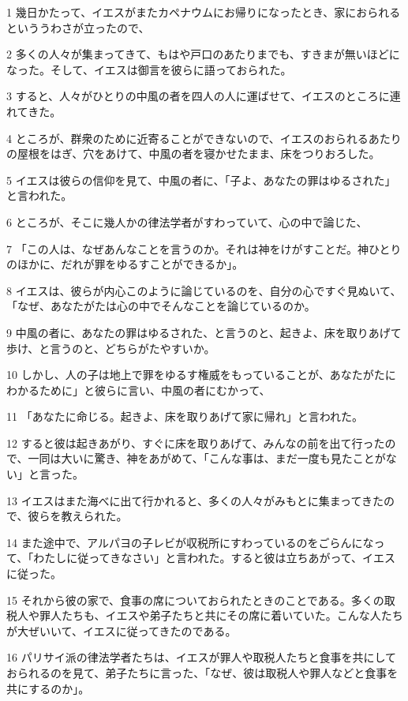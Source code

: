 \par 1 幾日かたって、イエスがまたカペナウムにお帰りになったとき、家におられるといううわさが立ったので、
\par 2 多くの人々が集まってきて、もはや戸口のあたりまでも、すきまが無いほどになった。そして、イエスは御言を彼らに語っておられた。
\par 3 すると、人々がひとりの中風の者を四人の人に運ばせて、イエスのところに連れてきた。
\par 4 ところが、群衆のために近寄ることができないので、イエスのおられるあたりの屋根をはぎ、穴をあけて、中風の者を寝かせたまま、床をつりおろした。
\par 5 イエスは彼らの信仰を見て、中風の者に、「子よ、あなたの罪はゆるされた」と言われた。
\par 6 ところが、そこに幾人かの律法学者がすわっていて、心の中で論じた、
\par 7 「この人は、なぜあんなことを言うのか。それは神をけがすことだ。神ひとりのほかに、だれが罪をゆるすことができるか」。
\par 8 イエスは、彼らが内心このように論じているのを、自分の心ですぐ見ぬいて、「なぜ、あなたがたは心の中でそんなことを論じているのか。
\par 9 中風の者に、あなたの罪はゆるされた、と言うのと、起きよ、床を取りあげて歩け、と言うのと、どちらがたやすいか。
\par 10 しかし、人の子は地上で罪をゆるす権威をもっていることが、あなたがたにわかるために」と彼らに言い、中風の者にむかって、
\par 11 「あなたに命じる。起きよ、床を取りあげて家に帰れ」と言われた。
\par 12 すると彼は起きあがり、すぐに床を取りあげて、みんなの前を出て行ったので、一同は大いに驚き、神をあがめて、「こんな事は、まだ一度も見たことがない」と言った。
\par 13 イエスはまた海べに出て行かれると、多くの人々がみもとに集まってきたので、彼らを教えられた。
\par 14 また途中で、アルパヨの子レビが収税所にすわっているのをごらんになって、「わたしに従ってきなさい」と言われた。すると彼は立ちあがって、イエスに従った。
\par 15 それから彼の家で、食事の席についておられたときのことである。多くの取税人や罪人たちも、イエスや弟子たちと共にその席に着いていた。こんな人たちが大ぜいいて、イエスに従ってきたのである。
\par 16 パリサイ派の律法学者たちは、イエスが罪人や取税人たちと食事を共にしておられるのを見て、弟子たちに言った、「なぜ、彼は取税人や罪人などと食事を共にするのか」。
